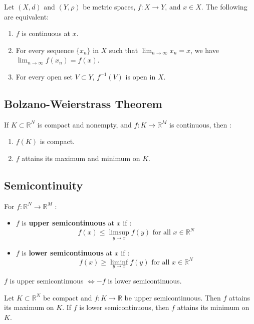 \begin{proposition}
    Let $(X,d)$ and $(Y,\rho)$ be metric spaces, $f : X \to Y$, and $x \in X$. The following are equivalent:
    \begin{enumerate}
        \item $f$ is continuous at $x$.
        \item For every sequence $\{x_n\}$ in $X$ such that $\lim_{n \to \infty} x_n = x$, we have $\lim_{n \to \infty} f(x_n) = f(x)$.
        \item For every open set $V \subset Y$, $f^{-1}(V)$ is open in $X$.
    \end{enumerate}
\end{proposition}
\subsection{Bolzano-Weierstrass Theorem}
\begin{theorem}
    If $K \subset \mathbb{R}^N$ is compact and nonempty, and $f : K \to \mathbb{R}^M$ is continuous, then :
    \begin{enumerate}
        \item $f(K)$ is compact.
        \item $f$ attains its maximum and minimum on $K$.
    \end{enumerate}
\end{theorem}

\subsection{Semicontinuity}
\begin{definition}
    For $f:\mathbb{R}^N \to \mathbb{R}^M$ :
    \begin{itemize}
        \item $f$ is \textbf{upper semicontinuous} at $x$ if :
        $$ f(x) \leq \limsup_{y \to x} f(y) \text{ for all } x \in \mathbb{R}^N$$
        \item $f$ is \textbf{lower semicontinuous} at $x$ if :
        $$ f(x) \geq \liminf_{y \to x} f(y) \text{ for all } x \in \mathbb{R}^N$$
    \end{itemize}
\end{definition}
\begin{remark} $f$ is upper semicontinuous $\Leftrightarrow -f$ is lower semicontinuous. \end{remark}
\begin{theorem}
    Let $K \subset \mathbb{R}^N$ be compact and $f: K \to \mathbb{R}$ be upper semicontinuous. Then $f$ attains its maximum on $K$. If $f$ is lower semicontinuous, then $f$ attains its minimum on $K$.
\end{theorem}

